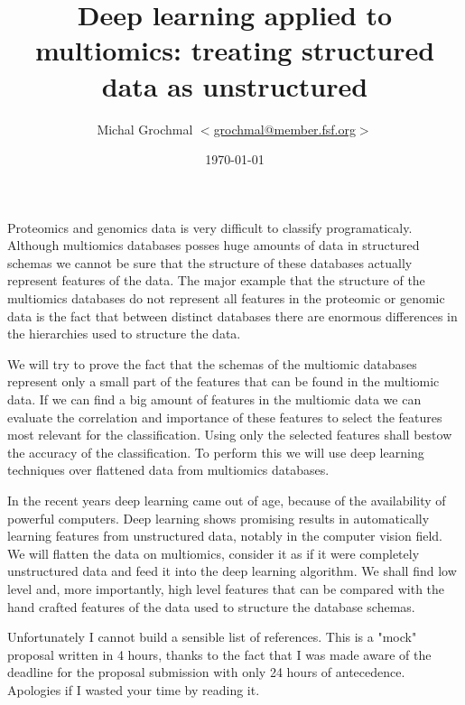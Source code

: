 \documentclass[a4paper,12pt]{article}
\title{Deep learning applied to multiomics: treating structured data as
unstructured}
\author{Michal Grochmal
  $<$\href{mailto:grochmal@member.fsf.org}{grochmal@member.fsf.org}$>$
}
\date{\today}
\begin{document}
\maketitle
\thispagestyle{empty}

Proteomics and genomics data is very difficult to classify programaticaly.
Although multiomics databases posses huge amounts of data in structured schemas
we cannot be sure that the structure of these databases actually represent
features of the data.  The major example that the structure of the multiomics
databases do not represent all features in the proteomic or genomic data is the
fact that between distinct databases there are enormous differences in the
hierarchies used to structure the data.

We will try to prove the fact that the schemas of the multiomic databases
represent only a small part of the features that can be found in the multiomic
data.  If we can find a big amount of features in the multiomic data we can
evaluate the correlation and importance of these features to select the
features most relevant for the classification.  Using only the selected
features shall bestow the accuracy of the classification.  To perform this we
will use deep learning techniques over flattened data from multiomics
databases.

In the recent years deep learning came out of age, because of the availability
of powerful computers.  Deep learning shows promising results in automatically
learning features from unstructured data, notably in the computer vision field.
We will flatten the data on multiomics, consider it as if it were completely
unstructured data and feed it into the deep learning algorithm.  We shall find
low level and, more importantly, high level features that can be compared with
the hand crafted features of the data used to structure the database schemas.

Unfortunately I cannot build a sensible list of references.  This is a "mock"
proposal written in 4 hours, thanks to the fact that I was made aware of the
deadline for the proposal submission with only 24 hours of antecedence.
Apologies if I wasted your time by reading it.
\end{document}
